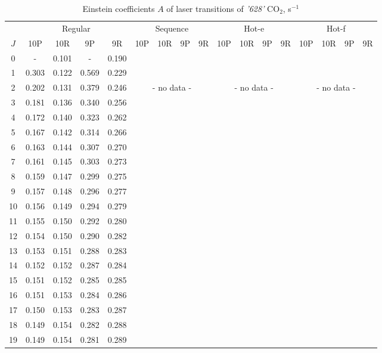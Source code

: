 \documentclass{report}
\begin{document}
\begin{table}
\centering
\caption{Einstein coefficients $A$ of laser transitions of \textit{'628'} CO$_2$, s$^{-1}$}
\label{table:A628}
\scriptsize
\begin{tabular}{|c|cccc|cccc|cccc|cccc|}
\hline
& \multicolumn{4}{c|}{Regular}& \multicolumn{4}{c|}{Sequence}& \multicolumn{4}{c|}{Hot-e}& \multicolumn{4}{c|}{Hot-f}\\
$J$ & 10P & 10R & 9P & 9R & 10P & 10R & 9P & 9R & 10P & 10R & 9P & 9R & 10P & 10R & 9P & 9R\\ 
\hline
0  &   -   & 0.101 &   -   & 0.190 & & & & & & & & & & & &\\
1  & 0.303 & 0.122 & 0.569 & 0.229 & & & & & & & & & & & &\\
2  & 0.202 & 0.131 & 0.379 & 0.246 & \multicolumn{4}{c|}{- no data -}& \multicolumn{4}{c|}{- no data -}& \multicolumn{4}{c|}{- no data -}\\
3  & 0.181 & 0.136 & 0.340 & 0.256 & & & & & & & & & & & &\\
4  & 0.172 & 0.140 & 0.323 & 0.262 & & & & & & & & & & & &\\
5  & 0.167 & 0.142 & 0.314 & 0.266 & & & & & & & & & & & &\\
6  & 0.163 & 0.144 & 0.307 & 0.270 & & & & & & & & & & & &\\
7  & 0.161 & 0.145 & 0.303 & 0.273 & & & & & & & & & & & &\\
8  & 0.159 & 0.147 & 0.299 & 0.275 & & & & & & & & & & & &\\
9  & 0.157 & 0.148 & 0.296 & 0.277 & & & & & & & & & & & &\\
10 & 0.156 & 0.149 & 0.294 & 0.279 & & & & & & & & & & & &\\
11 & 0.155 & 0.150 & 0.292 & 0.280 & & & & & & & & & & & &\\
12 & 0.154 & 0.150 & 0.290 & 0.282 & & & & & & & & & & & &\\
13 & 0.153 & 0.151 & 0.288 & 0.283 & & & & & & & & & & & &\\
14 & 0.152 & 0.152 & 0.287 & 0.284 & & & & & & & & & & & &\\
15 & 0.151 & 0.152 & 0.285 & 0.285 & & & & & & & & & & & &\\
16 & 0.151 & 0.153 & 0.284 & 0.286 & & & & & & & & & & & &\\
17 & 0.150 & 0.153 & 0.283 & 0.287 & & & & & & & & & & & &\\
18 & 0.149 & 0.154 & 0.282 & 0.288 & & & & & & & & & & & &\\
19 & 0.149 & 0.154 & 0.281 & 0.289 & & & & & & & & & & & &\\

\end{tabular}
\end{table}
\end{document}
